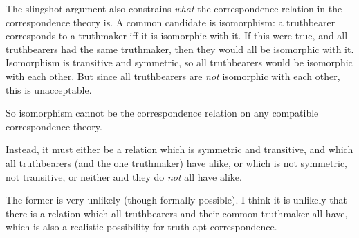 

The slingshot argument also constrains \emph{what} the correspondence relation in the correspondence theory is.
A common candidate is isomorphism: a truthbearer corresponds to a truthmaker iff it is isomorphic with it.
If this were true, and all truthbearers had the same truthmaker, then they would all be isomorphic with it.
Isomorphism is transitive and symmetric, so all truthbearers would be isomorphic with each other.
But since all truthbearers are \emph{not} isomorphic with each other, this is unacceptable.

So isomorphism cannot be the correspondence relation on any compatible correspondence theory.

Instead, it must either be a relation which is symmetric and transitive, and which all truthbearers (and the one truthmaker) have alike, or which is not symmetric, not transitive, or neither and they do \emph{not} all have alike.

The former is very unlikely (though formally possible).
I think it is unlikely that there is a relation which all truthbearers and their common truthmaker all have, which is also a realistic possibility for truth-apt correspondence.

